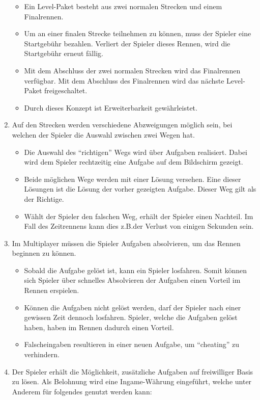 \begin{enumerate}
		\begin{itemize}
			\item{Ein Level-Paket besteht aus zwei normalen Strecken und einem Finalrennen.}
			\item{Um an einer finalen Strecke teilnehmen zu können, muss der Spieler eine Startgebühr bezahlen. Verliert der Spieler dieses Rennen, wird die Startgebühr erneut fällig.}
			\item{Mit dem Abschluss der zwei normalen Strecken wird das Finalrennen verfügbar. Mit dem Abschluss des Finalrennen wird das nächste Level-Paket freigeschaltet.}
			\item{Durch dieses Konzept ist Erweiterbarkeit gewährleistet.}
		\end{itemize}
		\item{Auf den Strecken werden verschiedene Abzweigungen möglich sein, bei welchen der Spieler die Auswahl zwischen zwei Wegen hat.}
		\begin{itemize}
			\item{Die Auswahl des \enquote{richtigen} Wegs wird über Aufgaben realisiert. Dabei wird dem Spieler rechtzeitig eine Aufgabe auf dem Bildschirm gezeigt.}
			\item{Beide möglichen Wege werden mit einer Lösung versehen. Eine dieser Lösungen ist die Lösung der vorher gezeigten Aufgabe. Dieser Weg gilt als der Richtige.}
			\item{Wählt der Spieler den falschen Weg, erhält der Spieler einen Nachteil. Im Fall des Zeitrennens kann dies z.B.\@ der Verlust von einigen Sekunden sein.}
		\end{itemize}
		\item{Im Multiplayer müssen die Spieler Aufgaben absolvieren, um das Rennen beginnen zu können.}
			\begin{itemize}
				\item{Sobald die Aufgabe gelöst ist, kann ein Spieler losfahren. Somit können sich Spieler über schnelles Absolvieren der Aufgaben einen Vorteil im Rennen erspielen.}
				\item{Können die Aufgaben nicht gelöst werden, darf der Spieler nach einer gewissen Zeit dennoch losfahren. Spieler, welche die Aufgaben gelöst haben, haben im Rennen dadurch einen Vorteil.}
				\item{Falscheingaben resultieren in einer neuen Aufgabe, um \enquote{cheating} zu verhindern.}
			\end{itemize}
		\item{Der Spieler erhält die Möglichkeit, zusätzliche Aufgaben auf freiwilliger Basis zu lösen. Als Belohnung wird eine Ingame-Währung eingeführt, welche unter Anderem für folgendes genutzt werden kann:}

\end{enumerate}
